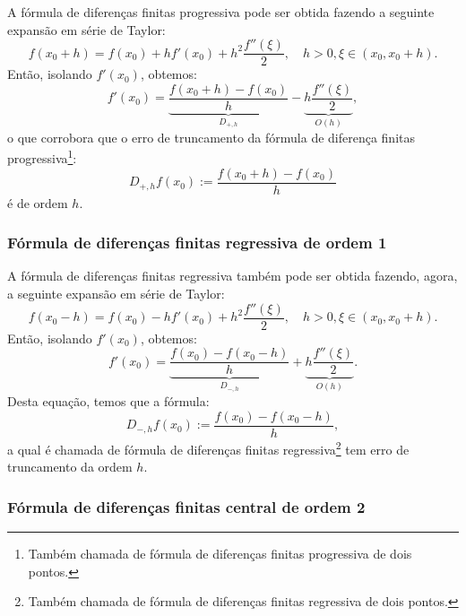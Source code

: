 A fórmula de diferenças finitas progressiva pode ser obtida fazendo a seguinte expansão em série de Taylor:
\begin{equation*}
  f(x_0+h) = f(x_0) + hf'(x_0) + h^2\frac{f''(\xi)}{2},\quad h>0, \xi\in(x_0,x_0+h).
\end{equation*}
Então, isolando $f'(x_0)$, obtemos:
\begin{equation}\label{eq:dp_trunc}
  f'(x_0) = \underbrace{\frac{f(x_0+h) - f(x_0)}{h}}_{D_{+,h}} - \underbrace{h\frac{f''(\xi)}{2}}_{O(h)},
\end{equation}
o que corrobora que o erro de truncamento da fórmula de diferença finitas progressiva\footnote{Também chamada de fórmula de diferenças finitas progressiva de dois pontos.}:
\begin{equation*}
  D_{+,h}f(x_0) := \frac{f(x_0+h)-f(x_0)}{h}
\end{equation*}
é de ordem $h$.

\subsubsection{Fórmula de diferenças finitas regressiva de ordem 1}

A fórmula de diferenças finitas regressiva também pode ser obtida fazendo, agora, a seguinte expansão em série de Taylor:
\begin{equation*}
  f(x_0-h) = f(x_0) - hf'(x_0) + h^2\frac{f''(\xi)}{2},\quad h>0, \xi\in(x_0, x_0+h).
\end{equation*}
Então, isolando $f'(x_0)$, obtemos:
\begin{equation*}
  f'(x_0) = \underbrace{\frac{f(x_0) - f(x_0-h)}{h}}_{D_{-,h}} + \underbrace{h\frac{f''(\xi)}{2}}_{O(h)}.
\end{equation*}
Desta equação, temos que a fórmula:
\begin{equation*}
  D_{-,h}f(x_0) := \frac{f(x_0)-f(x_0-h)}{h},
\end{equation*}
a qual é chamada de fórmula de diferenças finitas regressiva\footnote{Também chamada de fórmula de diferenças finitas regressiva de dois pontos.} tem erro de truncamento da ordem $h$.

\subsubsection{Fórmula de diferenças finitas central de ordem 2}

